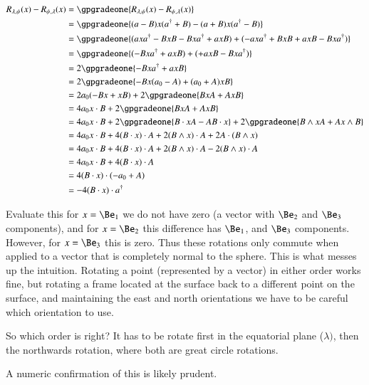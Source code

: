 \begin{align*}
R_{\lambda,\psi}(x) - R_{\psi,\lambda}(x)
&= \gpgradeone{R_{\lambda,\psi}(x) - R_{\psi,\lambda}(x)} \\
&= \gpgradeone{ (a - B) x (a^\dagger +B) -(a + B) x (a^\dagger -B) } \\
&= \gpgradeone{ ( a x a^\dagger -B x B -B x a^\dagger +a x B ) + ( - a x a^\dagger +B x B +a x B -B x a^\dagger ) } \\
&= \gpgradeone{ ( -B x a^\dagger +a x B ) + ( +a x B -B x a^\dagger ) } \\
&= 2\gpgradeone{ -B x a^\dagger +a x B } \\
&= 2\gpgradeone{ -B x (a_0 - A) + (a_0 + A) x B } \\
&= 2 a_0 ( -B x + x B ) + 2 \gpgradeone{ B x A + A x B } \\
&= 4 a_0 x \cdot B + 2 \gpgradeone{ B x A + A x B } \\
&= 4 a_0 x \cdot B + 2 \gpgradeone{ B \cdot x A - A B \cdot x } + 2 \gpgradeone{ B \wedge x A + A x \wedge B }  \\
&= 4 a_0 x \cdot B + 4 (B \cdot x) \cdot A + 2 (B \wedge x) \cdot A + 2 A \cdot (B \wedge x )  \\
&= 4 a_0 x \cdot B + 4 (B \cdot x) \cdot A + 2 (B \wedge x) \cdot A - 2 (B \wedge x ) \cdot A \\
&= 4 a_0 x \cdot B + 4 (B \cdot x) \cdot A \\
&= 4 (B \cdot x) \cdot (-a_0 + A) \\
&= -4 (B \cdot x) \cdot a^\dagger \\
\end{align*}

Evaluate this for $x = \Be_1$ we do not have zero (a vector with $\Be_2$ and $\Be_3$ components), and for $x = \Be_2$ this difference has $\Be_1$, and $\Be_3$ components.  However, for $x = \Be_3$ this is zero.  Thus these
rotations only commute when applied to a vector that is completely normal to the sphere.  This is what messes up the intuition.  Rotating a point (represented by a vector) in either order works fine, but rotating a frame located at the surface back to a different point on the surface, and maintaining the east and north orientations we have to be careful which orientation to use.

So which order is right?  It has to be rotate first in the equatorial plane ($\lambda)$, then the northwards rotation, where both are great circle rotations.

A numeric confirmation of this is likely prudent.
